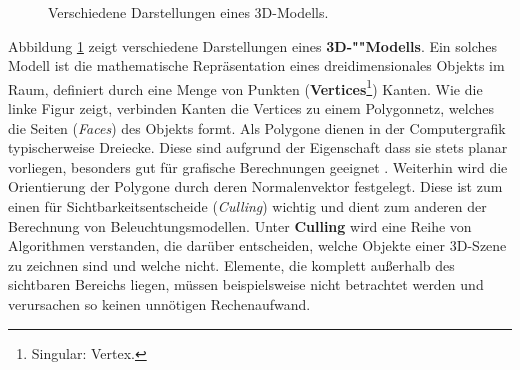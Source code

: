 \begin{figure}[htb]
	\centering
	\hfill
	\hfill
	\caption{Verschiedene Darstellungen eines 3D-Modells.}
	\label{FIG:3DMODELS_SHADING}
\end{figure}

Abbildung \ref{FIG:3DMODELS_SHADING} zeigt verschiedene Darstellungen eines \textbf{3D-""Modells}. Ein solches Modell ist die mathematische Repräsentation eines dreidimensionales Objekts im Raum, definiert durch eine Menge von Punkten (\textbf{Vertices}\footnote{Singular: Vertex.}) Kanten. Wie die linke Figur zeigt, verbinden Kanten die Vertices zu einem Polygonnetz, welches die Seiten (\emph{Faces}) des Objekts formt. Als Polygone dienen in der Computergrafik typischerweise Dreiecke. Diese sind aufgrund der Eigenschaft dass sie stets planar vorliegen, besonders gut für grafische Berechnungen geeignet \autocite{MOZILLA_CONCEPTS_OF_WEBGL}. Weiterhin wird die Orientierung der Polygone durch deren Normalenvektor festgelegt. Diese ist zum einen für Sichtbarkeitsentscheide (\emph{Culling}) wichtig und dient zum anderen der Berechnung von Beleuchtungsmodellen. Unter \textbf{Culling} wird eine Reihe von Algorithmen verstanden, die darüber entscheiden, welche Objekte einer 3D-Szene zu zeichnen sind und welche nicht. Elemente, die komplett außerhalb des sichtbaren Bereichs liegen, müssen beispielsweise nicht betrachtet werden und verursachen so keinen unnötigen Rechenaufwand.

